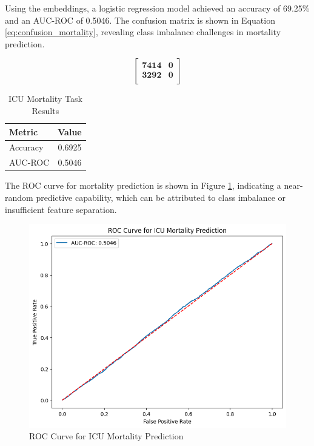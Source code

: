 \documentclass[twocolumn]{article}
\begin{document}
    Using the embeddings, a logistic regression model achieved an accuracy of
    69.25\% and an AUC-ROC of 0.5046. The confusion matrix is shown in Equation
    \ref{eq:confusion_mortality}, revealing class imbalance challenges in mortality
    prediction.

    \[
        \begin{bmatrix}
            \textbf{7414} & \textbf{0} \\
            \textbf{3292} & \textbf{0} \\
        \end{bmatrix}
        \label{eq:confusion_mortality}
    \]

    \begin{table}[h]
        \centering
        \begin{tabular}{|l|c|}
            \hline
            \textbf{Metric} & \textbf{Value} \\
            \hline
            Accuracy        & 0.6925         \\
            AUC-ROC         & 0.5046         \\
            \hline
        \end{tabular}
        \caption{ICU Mortality Task Results}
        \label{tab:mortality_results}
    \end{table}

    The ROC curve for mortality prediction is shown in Figure \ref{fig:roc_mortality},
    indicating a near-random predictive capability, which can be attributed to class
    imbalance or insufficient feature separation.

    \begin{figure}[ht]
        \centering
        \includegraphics[width=0.9\linewidth]{mortality.png}
        \caption{ROC Curve for ICU Mortality Prediction}
        \label{fig:roc_mortality}
    \end{figure}
\end{document}
